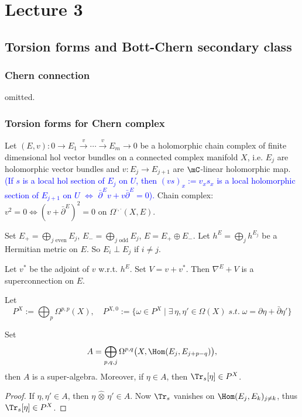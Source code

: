 \section{Lecture 3}
\subsection*{Torsion forms and Bott-Chern secondary class}
\subsubsection*{Chern connection}
omitted.
\subsubsection*{Torsion forms for Chern complex}
Let $(E,v):0\to E_1\overset{v}{\to}\cdots\overset{v}{\to}E_m\to0$ be a 
holomorphic chain complex of finite dimensional hol vector bundles on a 
connected complex manifold $X$, i.e. $E_j$ are holomorphic vector bundles 
and $v:E_j\to E_{j+1}$ are $\mC$-linear holomorphic map. 
\textcolor{blue}{(If $s$ is a local hol section of $E_j$ on $U$, then 
$(vs)_x:=v_xs_x$ is a local holomorphic section of $E_{j+1}$ on $U$ 
$\Longleftrightarrow$ $\bar{\partial}^{E}v+v\bar{\partial}^{E} = 0$).}
Chain complex: $v^2=0\Longleftrightarrow(v+\bar{\partial}^{E})^2=0$ on 
$\Omega^{\cdot,\cdot}(X,E)$. 

Set $E_+=\bigoplus\limits_{j\text{ even}}E_j$, 
$E_-=\bigoplus\limits_{j\text{ odd}}E_j$, 
$E=E_+\oplus E_-$. Let $h^E=\bigoplus\limits_j h^{E_j}$ be a 
Hermitian metric on $E$. So $E_i\perp E_j$ if $i\neq j$. 

Let $v^*$ be the adjoint of $v$ w.r.t. $h^E$. Set $V=v+v^*$. 
Then $\nabla^E+V$ is a superconnection on $E$.

Let 
\[
    P^X:=\bigoplus_p\Omega^{p,p}(X),\quad 
    P^{X,0}:=\{\omega\in P^X\mid\exists\,\eta,\eta'\in\Omega(X)
    \;s.t.\;\omega=\partial\eta+\bar{\partial}\eta'\}
\]

\begin{proposition}
    Set 
    \[
    A=\bigoplus_{p,q,j}\Omega^{p,q}\big(X,\Hom(E_j,E_{j+p-q})\big),
    \]
    then $A$ is a super-algebra. Moreover, if $\eta\in A$, then 
    $\Tr_s[\eta]\in P^X$.
\end{proposition}
\begin{proof}
    If $\eta,\eta'\in A$, then $\eta\,\hat{\otimes}\,\eta'\in A$. 
    Now $\Tr_s$ vanishes on $\Hom(E_j,E_k)_{j\neq k}$, thus 
    $\Tr_s[\eta]\in P^X$.
\end{proof}

